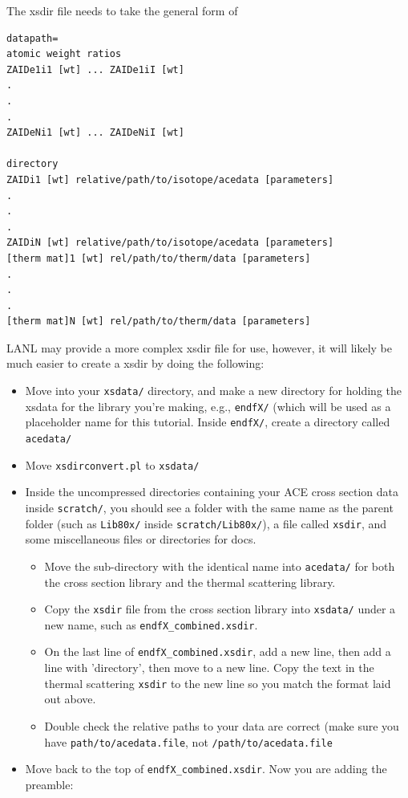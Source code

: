 \documentclass[12pt, letterpaper]{article}
\begin{document}
The xsdir file needs to take the general form of
\begin{verbatim}
datapath=
atomic weight ratios
ZAIDe1i1 [wt] ... ZAIDe1iI [wt] 
.
.
.
ZAIDeNi1 [wt] ... ZAIDeNiI [wt] 

directory
ZAIDi1 [wt] relative/path/to/isotope/acedata [parameters]
.
.
.
ZAIDiN [wt] relative/path/to/isotope/acedata [parameters]
[therm mat]1 [wt] rel/path/to/therm/data [parameters]
.
.
.
[therm mat]N [wt] rel/path/to/therm/data [parameters]
\end{verbatim}

LANL may provide a more complex xsdir file for use, however, it will likely be much easier to create a xsdir by doing the following:

\begin{itemize}
\item Move into your \verb|xsdata/| directory, and make a new directory for holding the xsdata for the library you're making, e.g., \verb|endfX/| (which will be used as a placeholder name for this tutorial.  Inside \verb|endfX/|, create a directory called \verb|acedata/|
\item Move \verb|xsdirconvert.pl| to \verb|xsdata/|
\item Inside the uncompressed directories containing your ACE cross section data inside \verb|scratch/|, you should see a folder with the same name as the parent folder (such as \verb|Lib80x/| inside \verb|scratch/Lib80x/|), a file called \verb|xsdir|, and some miscellaneous files or directories for docs.  
	\begin{itemize}
	\item Move the sub-directory with the identical name into \verb|acedata/| for both the cross section library and the thermal scattering library.
	\item Copy the \verb|xsdir| file from the cross section library into \verb|xsdata/| under a new name, such as \verb|endfX_combined.xsdir|.
	\item On the last line of \verb|endfX_combined.xsdir|, add a new line, then add a line with 'directory', then move to a new line.  Copy the text in the thermal scattering \verb|xsdir| to the new line so you match the format laid out above.
	\item Double check the relative paths to your data are correct (make sure you have \verb|path/to/acedata.file|, not \verb|/path/to/acedata.file|
	\end{itemize}
\item Move back to the top of \verb|endfX_combined.xsdir|.  Now you are adding the preamble:

\end{itemize}
\end{document}
